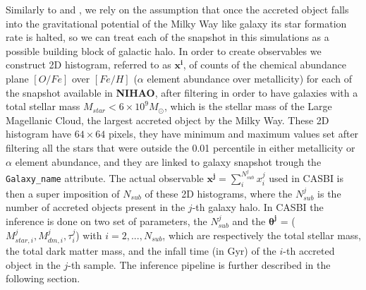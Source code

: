 Similarly to \cite{cunninghamReadingCARDsImprint2022} and \cite{deasonUnravellingMassSpectrum2023}, we rely on the assumption that once the accreted object falls into the gravitational potential of the Milky Way like galaxy its star formation rate is halted, so we can treat each of the snapshot in this simulations as a possible building block of galactic halo. In order to create observables we construct 2D histogram, referred to as \textbf{$\mathbf{x^i}$}, of counts of the chemical abundance plane $[O/Fe]$ over $[Fe/H]$ ($\alpha$ element abundance over metallicity) for each of the snapshot available in \textbf{NIHAO}, after filtering in order to have galaxies with a total stellar mass $M_{star} < 6 \times 10^9 M_\odot$, which is the stellar mass of the Large Magellanic Cloud, the largest accreted object by the Milky Way. These 2D histogram have $64 \times 64$ pixels, they have minimum and maximum values set after filtering all the stars that were outside the 0.01 percentile in either metallicity or $\alpha$ element abundance, and they are linked to galaxy snapshot trough the \texttt{Galaxy\_name} attribute. The actual observable \textbf{$\mathbf{x^j} = \sum_i^{N_{sub}^j} x^j_i$ } used in CASBI is then a super imposition of $N_{sub}$ of these 2D histograms, where the $N_{sub}^j$ is the number of accreted objects present in the $j$-th galaxy halo. In CASBI the inference is done on two set of parameters, the $N_{sub}^j$ and the \textbf{$\mathbf{\theta^j}$} = ($M_{star, i}^j, M_{dm, i}^j, \tau_i^j $) with $i=2, ..., N_{sub}$, which are respectively the total stellar mass, the total dark matter mass, and the infall time (in Gyr) of the $i$-th accreted object in the $j$-th sample. The inference pipeline is further described in  the following section.
  
